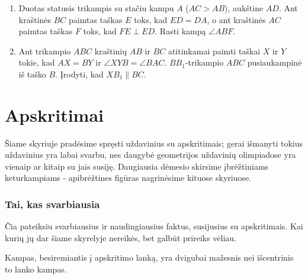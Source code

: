 \begin{enumerate}
\item Duotas statusis trikampis su stačiu kampu $A$ ($AC>AB$), aukštine $AD$. Ant
  kraštinės $BC$ paimtas taškas $E$ toks, kad $ED = DA$, o ant kraštinės $AC$
  paimtas taškas $F$ toks, kad $FE \perp{ED}$. Rasti kampą $\angle ABF$.
\item Ant trikampio $ABC$ kraštinių $AB$  ir $BC$ atitinkamai paimti taškai
  $X$ ir $Y$ tokie, kad $AX=BY$ ir $\angle XYB = \angle BAC$.
  $BB_1$-trikampio $ABC$ pusiaukampinė iš taško $B$. Įrodyti, kad $XB_1
  \parallel{BC}$.
\end{enumerate}

\newpage 
\section{Apskritimai}

Šiame skyriuje pradėsime spręsti uždavinius su apskritimais; gerai
išmanyti tokius uždavinius yra labai svarbu, nes daugybė
geometrijos uždavinių olimpiadose yra vienaip ar kitaip su jais susiję.
Daugiausia dėmesio skirsime įbrėžtiniams keturkampiams - apibrėžtines
figūras nagrinėsime kituose skyriuose.  

\subsubsection{Tai, kas svarbiausia}
Čia pateiksiu svarbiausius ir naudingiausius faktus, susijusius su
apskritimais. Kai kurių jų dar šiame skyrelyje nereikės, bet galbūt
prireiks vėliau.

\begin{teig} 
  Kampas, besiremiantis į apskritimo lanką, yra dvigubai mažesnis nei
  išcentrinis to lanko kampas. 
\end{teig}

